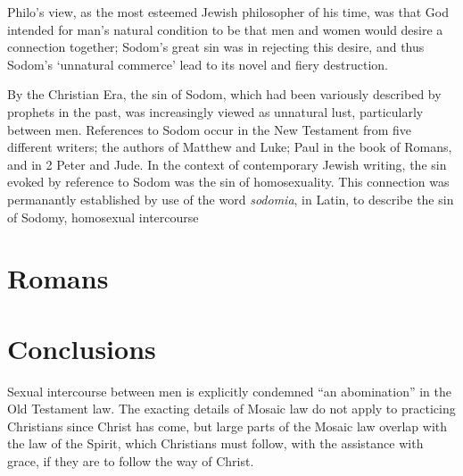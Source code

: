 \documentclass[10pt]{article}
\begin{document}
Philo's view, as the most esteemed Jewish philosopher of his time, was that God intended for man's natural condition to be that men and women would desire a connection together; Sodom's great sin was in rejecting this desire, and thus Sodom's `unnatural commerce' lead to its novel and fiery destruction. 

By the Christian Era, the sin of Sodom, which had been variously described by prophets in the past, was increasingly viewed as unnatural lust, particularly between men. References to Sodom occur in the New Testament from five different writers; the authors of Matthew and Luke; Paul in the book of Romans, and in 2 Peter and Jude. In the context of contemporary Jewish writing, the sin evoked by reference to Sodom was the sin of homosexuality. This connection was permanantly established by use of the word \textit{sodomia}, in Latin, to describe the sin of Sodomy, homosexual intercourse







\section*{Romans}

\section*{Conclusions}

Sexual intercourse between men is explicitly condemned ``an abomination'' in the Old Testament law. The exacting details of Mosaic law do not apply to practicing Christians since Christ has come, but large parts of the Mosaic law overlap with the law of the Spirit, which Christians must follow, with the assistance with grace, if they are to follow the way of Christ. 
\end{document}
